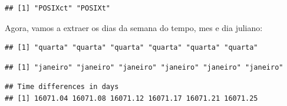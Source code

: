 \documentclass[]{book}
\newenvironment{Shaded}{\begin{snugshade}}{\end{snugshade}}
\newcommand{\KeywordTok}[1]{\textcolor[rgb]{0.13,0.29,0.53}{\textbf{#1}}}
\newcommand{\StringTok}[1]{\textcolor[rgb]{0.31,0.60,0.02}{#1}}
\newcommand{\OperatorTok}[1]{\textcolor[rgb]{0.81,0.36,0.00}{\textbf{#1}}}
\newcommand{\NormalTok}[1]{#1}
\theoremstyle{definition}
\theoremstyle{definition}
\theoremstyle{definition}
\theoremstyle{remark}
\begin{document}
\begin{Shaded}
\end{Shaded}

\begin{verbatim}
## [1] "POSIXct" "POSIXt"
\end{verbatim}

Agora, vamos a extraer os dias da semana do tempo, mes e dia juliano:

\begin{Shaded}
\end{Shaded}

\begin{verbatim}
## [1] "quarta" "quarta" "quarta" "quarta" "quarta" "quarta"
\end{verbatim}

\begin{Shaded}
\end{Shaded}

\begin{verbatim}
## [1] "janeiro" "janeiro" "janeiro" "janeiro" "janeiro" "janeiro"
\end{verbatim}

\begin{Shaded}
\end{Shaded}

\begin{verbatim}
## Time differences in days
## [1] 16071.04 16071.08 16071.12 16071.17 16071.21 16071.25
\end{verbatim}
\end{document}
